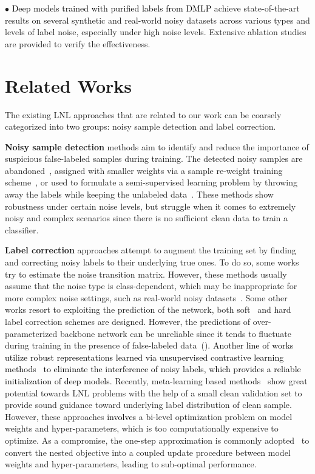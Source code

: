 \documentclass[10pt,twocolumn,letterpaper]{article}
\newcommand{\zbs}[1]{\textcolor{black}{#1}}
\newcommand{\lyx}[1]{\textcolor{black}{#1}}
\newcommand{\zbsN}[1]{\textcolor{black}{#1}}
\begin{document}
$\bullet$ \lyx{Deep models trained with purified labels from DMLP} achieve state-of-the-art results on several synthetic and real-world noisy datasets across various types and levels of label noise, especially under high noise levels. Extensive ablation studies are provided to verify the effectiveness.




\section{Related Works}
The existing LNL approaches that are related to our work can be coarsely categorized into two groups: noisy sample detection and label correction.  

\textbf{Noisy sample detection} methods aim to identify and reduce the importance of suspicious false-labeled samples during training. The detected noisy samples are abandoned~\cite{Co-han2018co,aumranking2020}, assigned with smaller weights via a sample re-weight training scheme~\cite{importance-reweight-pami2015}, or used to formulate a semi-supervised learning problem by throwing away the labels while keeping the unlabeled data~\cite{li2020dividemix,zhang2020decoupling}. These methods show robustness under certain noise levels, but struggle when it comes to extremely noisy and complex scenarios since there is no sufficient clean data to train a classifier. 

\textbf{Label correction} approaches attempt to augment the training set by finding and correcting noisy labels to their underlying true ones. To do so, some works~\cite{patrini2017making} try to estimate the noise transition matrix. However, these methods usually assume that the noise type is class-dependent, which may be inappropriate for more complex noise settings, such as real-world noisy datasets~\cite{Clothing1M}.
Some other works resort to exploiting the prediction of the network, both soft~\cite{Reed2015Training,han2019deep,yi2019probabilistic,arazo2019unsupervised} and hard~\cite{tanaka2018joint,song2019selfie} label correction schemes are designed. However, the predictions of over-parameterized backbone network can be unreliable since it tends to fluctuate during training in the presence of false-labeled data~(\cite{zhang2020decoupling}). 
\zbsN{Another line of works utilize robust representations learned via unsupervised contrastive learning methods~\cite{zhang2020decoupling,li2021learning,ghosh2021contrastive,zheltonozhskii2022contrast} to eliminate the interference of noisy labels, which provides a reliable initialization of deep models.}
Recently, meta-learning based methods~\cite{Learning-to-Reweight,MLNT,AAAI-2021-meta,zheng2021meta} show great potential towards LNL problems with the help of a small clean validation set to provide sound guidance toward underlying label distribution of clean sample. However, these approaches \zbs{involves} a bi-level optimization problem on model weights and hyper-parameters, which is too computationally expensive to optimize. As a compromise, the one-step approximation is commonly adopted~\cite{AAAI-2021-meta,zheng2021meta} to convert the nested objective into a coupled update procedure between model weights and hyper-parameters, leading to sub-optimal performance.
\end{document}
